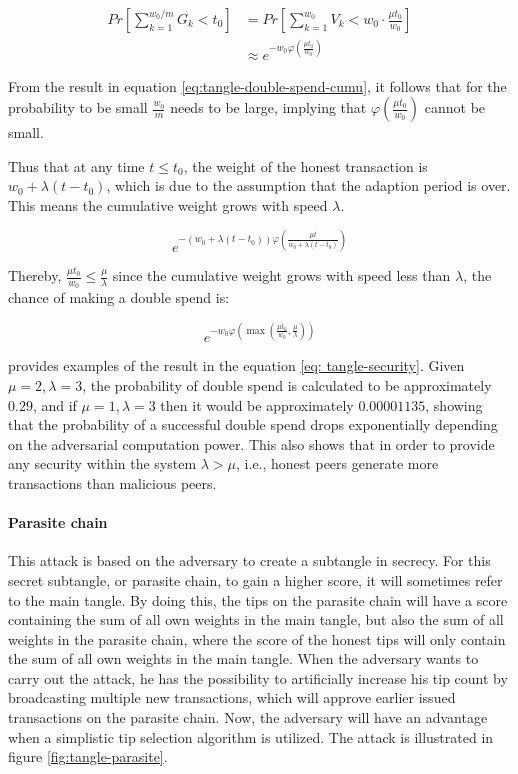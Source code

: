 \begin{align}
\label{eq:tangle-double-spend-cumu}
    Pr[\sum_{k=1}^{w_0 / m} G_k < t_0] &= Pr[\sum_{k=1}^{w_0} V_k < w_0 \cdot \frac{\mu t_0}{w_0}]\\
    &\approx e^{- w_0 \varphi(\frac{\mu t_0}{w_0})}
\end{align}

From the result in equation \ref{eq:tangle-double-spend-cumu}, it follows that for the probability to be small $\frac{w_0}{m}$ needs to be large, implying that $\varphi(\frac{\mu t_0}{w_0})$ cannot be small.

Thus that at any time $t \leq t_0$, the weight of the honest transaction is $w_0 + \lambda(t - t_0)$, which is due to the assumption that the adaption period is over. This means the cumulative weight grows with speed $\lambda$. 

\begin{equation*}
    e^{-(w_0 + \lambda(t-t_0)) \varphi(\frac{\mu t}{w_0 + \lambda(t-t_0)})}
\end{equation*}

Thereby, $\frac{\mu t_0}{w_0} \leq \frac{\mu}{\lambda}$ since the cumulative weight grows with speed less than $\lambda$, the chance of making a double spend is:

\begin{equation}
\label{eq: tangle-security}
    e^{-w_0 \varphi(\max(\frac{\mu t_0}{w_0}, \frac{\mu}{\lambda}))}
\end{equation}

\cite{tangle} provides examples of the result in the equation \ref{eq: tangle-security}. Given $\mu = 2, \lambda = 3$, the probability of double spend is calculated to be approximately $0.29$, and if $\mu = 1, \lambda = 3$ then it would be approximately $0.00001135$, showing that the probability of a successful double spend drops exponentially depending on the adversarial computation power. This also shows that in order to provide any security within the system $\lambda > \mu$, i.e., honest peers generate more transactions than malicious peers.

\paragraph{Parasite chain} 
This attack is based on the adversary to create a subtangle in secrecy. For this secret subtangle, or parasite chain, to gain a higher score, it will sometimes refer to the main tangle. By doing this, the tips on the parasite chain will have a score containing the sum of all own weights in the main tangle, but also the sum of all weights in the parasite chain, where the score of the honest tips will only contain the sum of all own weights in the main tangle. When the adversary wants to carry out the attack, he has the possibility to artificially increase his tip count by broadcasting multiple new transactions, which will approve earlier issued transactions on the parasite chain. Now, the adversary will have an advantage when a simplistic tip selection algorithm is utilized.
The attack is illustrated in figure \ref{fig:tangle-parasite}.


